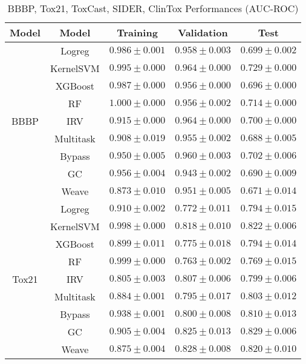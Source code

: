 \begin{table}[H]
    \small
    \centering
    \caption{BBBP, Tox21, ToxCast, SIDER, ClinTox Performances (AUC-ROC)}
    \begin{tabular}{ |c|c|c|c|c| } 
    \hline
    \textbf{Model} & \textbf{Model} & \textbf{Training} & \textbf{Validation} & \textbf{Test} \\
    \hline
    \hline    
    \multirow{9}{*}{BBBP}
    & Logreg & $0.986\pm0.001$ & $0.958\pm0.003$ & $0.699\pm0.002$ \\\cline{2-5}
    & KernelSVM & $0.995\pm0.000$ & $0.964\pm0.000$ & $\mathbf{0.729\pm0.000}$ \\\cline{2-5}
    & XGBoost & $0.987\pm0.000$ & $0.956\pm0.000$ & $0.696\pm0.000$ \\\cline{2-5}
    & RF & $1.000\pm0.000$ & $0.956\pm0.002$ & $0.714\pm0.000$ \\\cline{2-5}
    & IRV & $0.915\pm0.000$ & $\mathbf{0.964\pm0.000}$ & $0.700\pm0.000$ \\\cline{2-5}
    & Multitask & $0.908\pm0.019$ & $0.955\pm0.002$ & $0.688\pm0.005$ \\\cline{2-5}
    & Bypass & $0.950\pm0.005$ & $0.960\pm0.003$ & $0.702\pm0.006$ \\\cline{2-5}
    & GC & $0.956\pm0.004$ & $0.943\pm0.002$ & $0.690\pm0.009$ \\\cline{2-5}
    & Weave & $0.873\pm0.010$ & $0.951\pm0.005$ & $0.671\pm0.014$ \\\cline{2-5}
    \hline
    \hline    
    \multirow{9}{*}{Tox21}
    & Logreg & $0.910\pm0.002$ & $0.772\pm0.011$ & $0.794\pm0.015$ \\\cline{2-5}
    & KernelSVM & $0.998\pm0.000$ & $0.818\pm0.010$ & $0.822\pm0.006$ \\\cline{2-5}
    & XGBoost & $0.899\pm0.011$ & $0.775\pm0.018$ & $0.794\pm0.014$ \\\cline{2-5}
    & RF & $0.999\pm0.000$ & $0.763\pm0.002$ & $0.769\pm0.015$ \\\cline{2-5}
    & IRV & $0.805\pm0.003$ & $0.807\pm0.006$ & $0.799\pm0.006$ \\\cline{2-5}
    & Multitask & $0.884\pm0.001$ & $0.795\pm0.017$ & $0.803\pm0.012$ \\\cline{2-5}
    & Bypass & $0.938\pm0.001$ & $0.800\pm0.008$ & $0.810\pm0.013$ \\\cline{2-5}
    & GC & $0.905\pm0.004$ & $0.825\pm0.013$ & $\mathbf{0.829\pm0.006}$ \\\cline{2-5}
    & Weave & $0.875\pm0.004$ & $\mathbf{0.828\pm0.008}$ & $0.820\pm0.010$ \\\cline{2-5}

\end{tabular}
\end{table}
